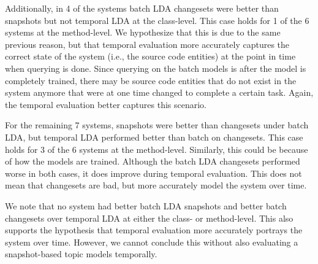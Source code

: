 Additionally, in 4 of the systems batch LDA changesets were better than
snapshots but not temporal LDA at the class-level.  This case holds for 1 of
the 6 systems at the method-level.  We hypothesize that this is due to the same
previous reason, but that temporal evaluation more accurately captures the
correct state of the system (i.e., the source code entities) at the point in
time when querying is done.  Since querying on the batch models is after the
model is completely trained, there may be source code entities that do not
exist in the system anymore that were at one time changed to complete a certain
task.  Again, the temporal evaluation better captures this scenario.

For the remaining 7 systems, snapshots were better than changesets under batch
LDA, but temporal LDA performed better than batch on changesets.  This case
holds for 3 of the 6 systems at the method-level.  Similarly, this could be
because of how the models are trained.  Although the batch LDA changesets
performed worse in both cases, it does improve during temporal evaluation.
This does not mean that changesets are bad, but more accurately model the
system over time.

We note that no system had better batch LDA snapshots and better batch
changesets over temporal LDA at either the class- or method-level.  This also
supports the hypothesis that temporal evaluation more accurately portrays the
system over time.  However, we cannot conclude this without also evaluating a
snapshot-based topic models temporally.
